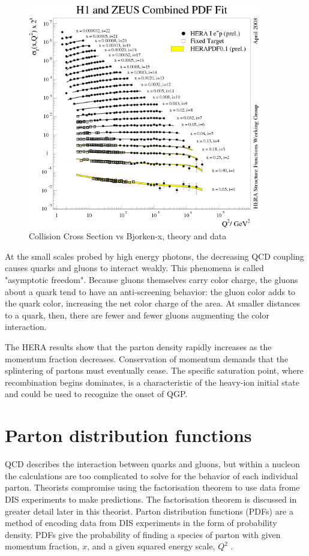 \begin{figure}[h!]
\begin{centering}
\includegraphics[width=4in]{Chapter1/importfigs/scholarpedia_bjorken_x_qcdExp.png}
\par\end{centering}
\caption{Collision Cross Section vs Bjorken-x, theory and data \cite{Shimizu:2009fc} \label{fig:qcdBjorkenX}}
\end{figure}

At the small scales probed by high energy photons, the decreasing QCD coupling causes quarks and gluons to interact weakly. This phenomena is called "asymptotic freedom". Because gluons themselves carry color charge, the gluons about a quark tend to have an anti-screening behavior: the gluon color adds to the quark color, increasing the net color charge of the area. At smaller distances to a quark, then, there are fewer and fewer gluons augmenting the color interaction.

The HERA results show that the parton density rapidly increases as the momentum fraction decreases. Conservation of momentum demands that the splintering of partons must eventually cease. The specific saturation point, where recombination begins dominates, is a characteristic of the heavy-ion initial state  and could be used to recognize the onset of QGP. 

\section{Parton distribution functions}

QCD describes the interaction between quarks and gluons, but within a nucleon the calculations are too complicated to solve for the behavior of each individual parton. Theorists compromise using the factorisation theorem to use data frome DIS experiments to make predictions. The factorisation theorem is discussed in greater detail later in this theorist. Parton distribution functions (PDFs) are a method of encoding data from DIS experiments in the form of probability density. PDFs give the probability of finding a species of parton with given momentum fraction, $x$, and a given squared energy scale, $Q^2$ \cite{Martin:2009iq}\cite{Eskola:2008ca}\cite{Pumplin:2002vw}\cite{cmsJpPP}.

